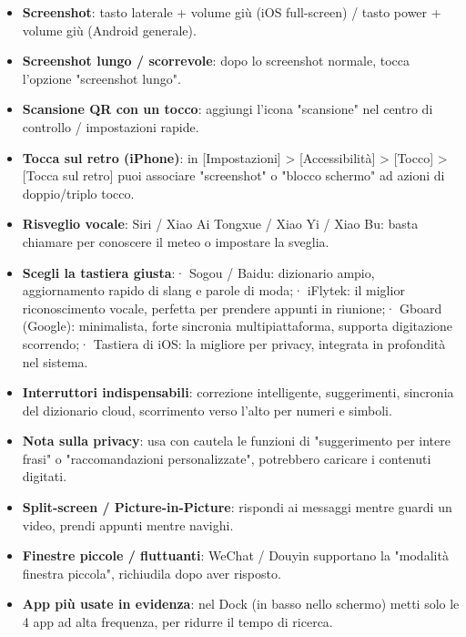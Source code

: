 \begin{itemize}
  \item \textbf{Screenshot}: tasto laterale + volume giù (iOS full-screen) / tasto power + volume giù (Android generale).
  \item \textbf{Screenshot lungo / scorrevole}: dopo lo screenshot normale, tocca l'opzione "screenshot lungo".
  \item \textbf{Scansione QR con un tocco}: aggiungi l'icona "scansione" nel centro di controllo / impostazioni rapide.
  \item \textbf{Tocca sul retro (iPhone)}: in [Impostazioni] > [Accessibilità] > [Tocco] > [Tocca sul retro] puoi associare "screenshot" o "blocco schermo" ad azioni di doppio/triplo tocco.
  \item \textbf{Risveglio vocale}: Siri / Xiao Ai Tongxue / Xiao Yi / Xiao Bu: basta chiamare per conoscere il meteo o impostare la sveglia.
\end{itemize}


\begin{itemize}
  \item \textbf{Scegli la tastiera giusta}:\newline · Sogou / Baidu: dizionario ampio, aggiornamento rapido di slang e parole di moda;\newline · iFlytek: il miglior riconoscimento vocale, perfetta per prendere appunti in riunione;\newline · Gboard (Google): minimalista, forte sincronia multipiattaforma, supporta digitazione scorrendo;\newline · Tastiera di iOS: la migliore per privacy, integrata in profondità nel sistema.
  \item \textbf{Interruttori indispensabili}: correzione intelligente, suggerimenti, sincronia del dizionario cloud, scorrimento verso l'alto per numeri e simboli.
  \item \textbf{Nota sulla privacy}: usa con cautela le funzioni di "suggerimento per intere frasi" o "raccomandazioni personalizzate", potrebbero caricare i contenuti digitati.
\end{itemize}


\begin{itemize}
  \item \textbf{Split-screen / Picture-in-Picture}: rispondi ai messaggi mentre guardi un video, prendi appunti mentre navighi.
  \item \textbf{Finestre piccole / fluttuanti}: WeChat / Douyin supportano la "modalità finestra piccola", richiudila dopo aver risposto.
  \item \textbf{App più usate in evidenza}: nel Dock (in basso nello schermo) metti solo le 4 app ad alta frequenza, per ridurre il tempo di ricerca.
\end{itemize}

